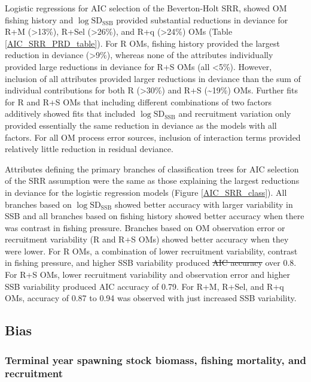 \documentclass[
  12pt,
]{article}
\makeatletter
\providecommand{\DIFadd}[1]{{\protect\color{blue}\uwave{#1}}} %
\providecommand{\DIFdel}[1]{{\protect\color{red}\sout{#1}}} %
\providecommand{\DIFaddbegin}{} %
\providecommand{\DIFaddend}{} %
\providecommand{\DIFdelbegin}{} %
\providecommand{\DIFdelend}{} %
\providecommand{\DIFscaledelfig}{0.5}
\newlength{\DIFdelgraphicswidth} %
\newlength{\DIFdelgraphicsheight} %
\providecommand{\DIFaddincludegraphics}[2][]{{\color{blue}\fbox{\DIFOincludegraphics[#1]{#2}}}} %
\providecommand{\DIFdelincludegraphics}[2][]{%
\sbox{\DIFdelgraphicsbox}{\DIFOincludegraphics[#1]{#2}}%
\settoboxwidth{\DIFdelgraphicswidth}{\DIFdelgraphicsbox} %
\settoboxtotalheight{\DIFdelgraphicsheight}{\DIFdelgraphicsbox} %
\scalebox{\DIFscaledelfig}{%
\parbox[b]{\DIFdelgraphicswidth}{\usebox{\DIFdelgraphicsbox}\\[-\baselineskip] \rule{\DIFdelgraphicswidth}{0em}}\llap{\resizebox{\DIFdelgraphicswidth}{\DIFdelgraphicsheight}{%
\setlength{\unitlength}{\DIFdelgraphicswidth}%
\begin{picture}(1,1)%
\thicklines\linethickness{2pt} %
{\color[rgb]{1,0,0}\put(0,0){\framebox(1,1){}}}%
{\color[rgb]{1,0,0}\put(0,0){\line( 1,1){1}}}%
{\color[rgb]{1,0,0}\put(0,1){\line(1,-1){1}}}%
\end{picture}%
}\hspace*{3pt}}} %
} %
\DeclareRobustCommand{\DIFaddbegin}{\DIFOaddbegin \let\includegraphics\DIFaddincludegraphics} %
\DeclareRobustCommand{\DIFaddend}{\DIFOaddend \let\includegraphics\DIFOincludegraphics} %
\DeclareRobustCommand{\DIFdelbegin}{\DIFOdelbegin \let\includegraphics\DIFdelincludegraphics} %
\DeclareRobustCommand{\DIFdelend}{\DIFOaddend \let\includegraphics\DIFOincludegraphics} %
\let\sout@orig\sout %
\renewcommand{\sout}[1]{\ifmmode\text{\sout@orig{\ensuremath{#1}}}\else\sout@orig{#1}\fi} %
\makeatother
\begin{document}
Logistic regressions for AIC selection of the Beverton-Holt SRR, showed
OM fishing history and \(\log \text{SD}_{\text{SSB}}\) provided
substantial reductions in deviance for R+M (\textgreater13\%), R+Sel
(\textgreater26\%), and R+q (\textgreater24\%) OMs (Table
\ref{AIC_SRR_PRD_table}). For R OMs, fishing history provided the
largest reduction in deviance (\textgreater9\%), whereas none of the
attributes individually provided large reductions in deviance for R+S
OMs (all \textless5\%). However, inclusion of all attributes provided
larger reductions in deviance than the sum of individual contributions
for both R (\textgreater30\%) and R+S (\textasciitilde19\%) OMs. Further
fits for R and R+S OMs that including different combinations of two
factors additively showed fits that included
\(\log \text{SD}_{\text{SSB}}\) and recruitment variation only provided
essentially the same reduction in deviance as the models with all
factors. For all OM process error sources, inclusion of interaction
terms provided relatively little reduction in residual deviance.

Attributes defining the primary branches of classification trees for AIC
selection of the SRR assumption were the same as those explaining the
largest reductions in deviance for the logistic regression models
(Figure \ref{AIC_SRR_class}). All branches based on
\(\log \text{SD}_{\text{SSB}}\) showed better accuracy with larger
variability in SSB and all branches based on fishing history showed
better accuracy when there was contrast in fishing pressure. Branches
based on OM observation error or recruitment variability (R and R+S OMs)
showed better accuracy when they were lower. For R OMs, a combination of
lower recruitment variability, contrast in fishing pressure, and higher
SSB variability produced \DIFdelbegin \DIFdel{AIC accuracy }\DIFdelend \DIFaddbegin \DIFadd{accuracy of AIC selection of the SRR }\DIFaddend over 0.8.
For R+S OMs, lower recruitment variability and observation error and
higher SSB variability produced AIC accuracy of 0.79. For R+M, R+Sel,
and R+q OMs, accuracy of 0.87 to 0.94 was observed with just increased
SSB variability.

\subsection*{Bias}\label{bias-1}

\subsubsection*{Terminal year spawning stock biomass, fishing mortality,
and
recruitment}\label{terminal-year-spawning-stock-biomass-fishing-mortality-and-recruitment}
\end{document}
